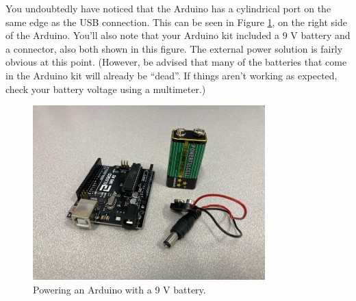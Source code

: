 You undoubtedly have noticed that the Arduino has a cylindrical port on the
same edge as the USB connection. This can be seen in Figure \ref{fig:power}, 
on the right side of the Arduino. You'll also note that your Arduino kit
included a 9 V battery and a connector, also both shown in this figure. The
external power solution is fairly obvious at this point. (However, be advised
that many of the batteries that come in the Arduino kit will already be 
``dead''. If things aren't working as expected, check your battery voltage
using a multimeter.)
\begin{figure}[htbp!]
	\centering
	\includegraphics[width=0.8\textwidth]{Figures/power.jpg}
	\caption[Powering an Arduino with a 9 V battery]
	{Powering an Arduino with a 9 V battery.}
	\label{fig:power}
\end{figure}


